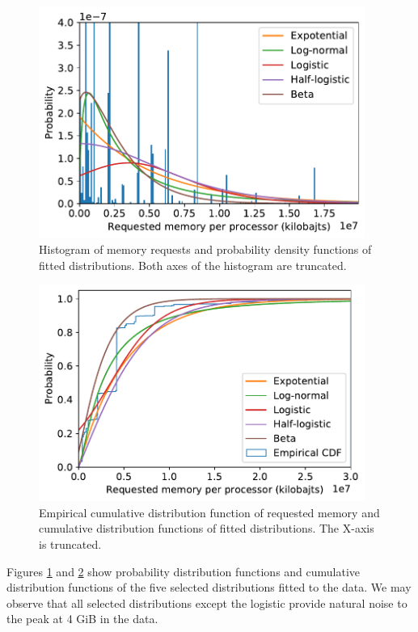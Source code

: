 \documentclass[thesis-en.tex]{subfiles}
\begin{document}
\begin{figure}[p]
    \centering
    \includegraphics[width=0.95\textwidth]{images/fitted_pdfs.pdf}
    \caption{Histogram of memory requests and probability density functions of fitted distributions. Both axes of the histogram are truncated.}
    \label{fig:fitted-pdfs}
\end{figure}

\begin{figure}[p]
    \centering
    \includegraphics[width=0.95\textwidth]{images/fitted_cdfs.pdf}
    \caption{Empirical cumulative distribution function of requested memory and cumulative distribution functions of fitted distributions. The X-axis is truncated.}
    \label{fig:fitted-cdfs}
\end{figure}

Figures \ref{fig:fitted-pdfs} and \ref{fig:fitted-cdfs} show probability distribution functions and cumulative distribution functions of the five selected distributions fitted to the data. We may observe that all selected distributions except the logistic provide natural noise to the peak at 4 GiB in the data.
\end{document}
